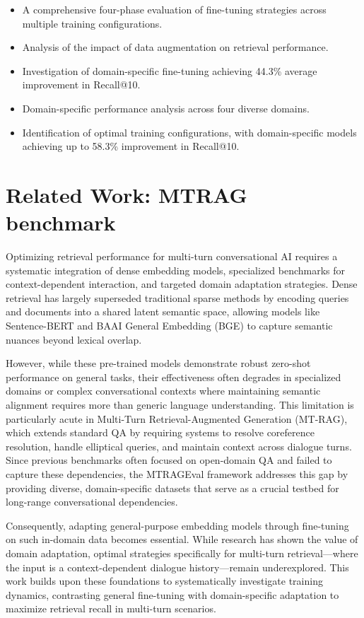\documentclass[11pt]{article}
\begin{document}
\begin{itemize}
    \item A comprehensive four-phase evaluation of fine-tuning strategies across multiple training configurations.
    \item Analysis of the impact of data augmentation on retrieval performance.
    \item Investigation of domain-specific fine-tuning achieving 44.3\% average improvement in Recall@10.
    \item Domain-specific performance analysis across four diverse domains.
    \item Identification of optimal training configurations, with domain-specific models achieving up to 58.3\% improvement in Recall@10.
\end{itemize}

\section{Related Work: MTRAG benchmark}

Optimizing retrieval performance for multi-turn conversational AI requires a systematic integration of dense embedding models, specialized benchmarks for context-dependent interaction, and targeted domain adaptation strategies. Dense retrieval has largely superseded traditional sparse methods by encoding queries and documents into a shared latent semantic space, allowing models like Sentence-BERT \cite{reimers2019sentence} and BAAI General Embedding (BGE) \cite{bge2023} to capture semantic nuances beyond lexical overlap. 

However, while these pre-trained models demonstrate robust zero-shot performance on general tasks, their effectiveness often degrades in specialized domains or complex conversational contexts where maintaining semantic alignment requires more than generic language understanding. This limitation is particularly acute in Multi-Turn Retrieval-Augmented Generation (MT-RAG), which extends standard QA by requiring systems to resolve coreference resolution, handle elliptical queries, and maintain context across dialogue turns. Since previous benchmarks often focused on open-domain QA and failed to capture these dependencies, the MTRAGEval framework addresses this gap by providing diverse, domain-specific datasets that serve as a crucial testbed for long-range conversational dependencies. 

Consequently, adapting general-purpose embedding models through fine-tuning on such in-domain data becomes essential. While research has shown the value of domain adaptation, optimal strategies specifically for multi-turn retrieval—where the input is a context-dependent dialogue history—remain underexplored. This work builds upon these foundations to systematically investigate training dynamics, contrasting general fine-tuning with domain-specific adaptation to maximize retrieval recall in multi-turn scenarios.
\end{document}
